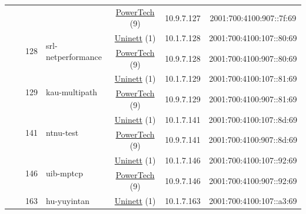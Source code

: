 \begin{small}
\begin{center}
\begin{longtable}{|c|c|c|c|c|c|c|c|}
  &  &  &  & \multicolumn{2}{|c|}{\tiny{\href{http://www.powertech.no}{PowerTech} (9)}} & \tiny{10.9.7.127} & \tiny{2001:700:4100:907::7f:69} \\* \cline{3-3}\cline{4-4}\cline{5-5}\cline{6-6}\cline{7-7}\cline{8-8}
  &  & \multirow{2}{*}{\tiny{128}} & \multicolumn{1}{|l|}{\multirow{2}{*}{\tiny{srl-netperformance}}} & \multicolumn{2}{|c|}{\tiny{\href{https://www.uninett.no}{Uninett} (1)}} & \tiny{10.1.7.128} & \tiny{2001:700:4100:107::80:69} \\* \cline{5-5}\cline{6-6}\cline{7-7}\cline{8-8}
  &  &  &  & \multicolumn{2}{|c|}{\tiny{\href{http://www.powertech.no}{PowerTech} (9)}} & \tiny{10.9.7.128} & \tiny{2001:700:4100:907::80:69} \\* \cline{3-3}\cline{4-4}\cline{5-5}\cline{6-6}\cline{7-7}\cline{8-8}
  &  & \multirow{2}{*}{\tiny{129}} & \multicolumn{1}{|l|}{\multirow{2}{*}{\tiny{kau-multipath}}} & \multicolumn{2}{|c|}{\tiny{\href{https://www.uninett.no}{Uninett} (1)}} & \tiny{10.1.7.129} & \tiny{2001:700:4100:107::81:69} \\* \cline{5-5}\cline{6-6}\cline{7-7}\cline{8-8}
  &  &  &  & \multicolumn{2}{|c|}{\tiny{\href{http://www.powertech.no}{PowerTech} (9)}} & \tiny{10.9.7.129} & \tiny{2001:700:4100:907::81:69} \\* \cline{3-3}\cline{4-4}\cline{5-5}\cline{6-6}\cline{7-7}\cline{8-8}
  &  & \multirow{2}{*}{\tiny{141}} & \multicolumn{1}{|l|}{\multirow{2}{*}{\tiny{ntnu-test}}} & \multicolumn{2}{|c|}{\tiny{\href{https://www.uninett.no}{Uninett} (1)}} & \tiny{10.1.7.141} & \tiny{2001:700:4100:107::8d:69} \\* \cline{5-5}\cline{6-6}\cline{7-7}\cline{8-8}
  &  &  &  & \multicolumn{2}{|c|}{\tiny{\href{http://www.powertech.no}{PowerTech} (9)}} & \tiny{10.9.7.141} & \tiny{2001:700:4100:907::8d:69} \\* \cline{3-3}\cline{4-4}\cline{5-5}\cline{6-6}\cline{7-7}\cline{8-8}
  &  & \multirow{2}{*}{\tiny{146}} & \multicolumn{1}{|l|}{\multirow{2}{*}{\tiny{uib-mptcp}}} & \multicolumn{2}{|c|}{\tiny{\href{https://www.uninett.no}{Uninett} (1)}} & \tiny{10.1.7.146} & \tiny{2001:700:4100:107::92:69} \\* \cline{5-5}\cline{6-6}\cline{7-7}\cline{8-8}
  &  &  &  & \multicolumn{2}{|c|}{\tiny{\href{http://www.powertech.no}{PowerTech} (9)}} & \tiny{10.9.7.146} & \tiny{2001:700:4100:907::92:69} \\* \cline{3-3}\cline{4-4}\cline{5-5}\cline{6-6}\cline{7-7}\cline{8-8}
  &  & \multirow{2}{*}{\tiny{163}} & \multicolumn{1}{|l|}{\multirow{2}{*}{\tiny{hu-yuyintan}}} & \multicolumn{2}{|c|}{\tiny{\href{https://www.uninett.no}{Uninett} (1)}} & \tiny{10.1.7.163} & \tiny{2001:700:4100:107::a3:69} \\* \cline{5-5}\cline{6-6}\cline{7-7}\cline{8-8}

\end{longtable}
\end{center}
\end{small}
